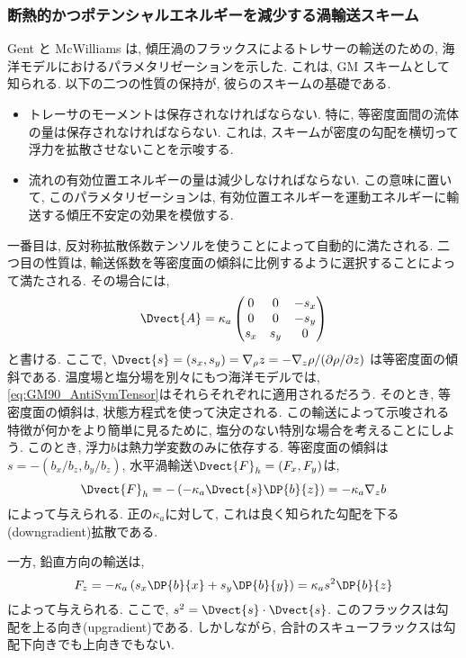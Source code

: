 \subsubsection*{断熱的かつポテンシャルエネルギーを減少する渦輸送スキーム}
Gent と McWilliams は, 傾圧渦のフラックスによるトレサーの輸送のための, 
海洋モデルにおけるパラメタリゼーションを示した. 
これは, GM スキームとして知られる. 
以下の二つの性質の保持が, 彼らのスキームの基礎である. 
\begin{itemize}
 \item トレーサのモーメントは保存されなければならない. 特に, 等密度面間の流体の量は保存されなければならない. これは, スキームが密度の勾配を横切って浮力を拡散させないことを示唆する. 
 \item 流れの有効位置エネルギーの量は減少しなければならない. この意味に置いて, このパラメタリゼーションは, 有効位置エネルギーを運動エネルギーに輸送する傾圧不安定の効果を模倣する. 
\end{itemize}
一番目は, 反対称拡散係数テンソルを使うことによって自動的に満たされる. 
二つ目の性質は, 輸送係数を等密度面の傾斜に比例するように選択することによって満たされる. 
その場合には, 
\begin{equation}
  \Dvect{A} = \kappa_a
\begin{pmatrix}
 0 &0 &-s_x \\
 0 &0 &-s_y \\
 s_x &s_y &0
\end{pmatrix}
\label{eq:GM90_AntiSymTensor}
\end{equation}
と書ける. 
ここで, $\Dvect{s}=(s_x, s_y)=\nabla_\rho z=- \nabla_z \rho/(\partial \rho/\partial z)$
は等密度面の傾斜である. 
温度場と塩分場を別々にもつ海洋モデルでは, \eqref{eq:GM90_AntiSymTensor}はそれらそれぞれに適用されるだろう. 
そのとき, 等密度面の傾斜は, 状態方程式を使って決定される. 
この輸送によって示唆される特徴が何かをより簡単に見るために, 塩分のない特別な場合を考えることにしよう. 
このとき, 浮力$b$は熱力学変数のみに依存する. 
等密度面の傾斜は$s=-(b_x/b_z, b_y/b_z)$, 水平渦輸送$\Dvect{F}_h=(F_x, F_y)$は, 
\begin{equation}
 \Dvect{F}_h = -\left(-\kappa_a \Dvect{s} \DP{b}{z} \right)
             = - \kappa_a \nabla_z b
\end{equation}
によって与えられる. 
正の$\kappa_a$に対して, これは良く知られた勾配を下る(downgradient)拡散である. 

一方, 鉛直方向の輸送は, 
\begin{equation}
  F_z = - \kappa_a \left(s_x\DP{b}{x} + s_y\DP{b}{y}\right)
      = \kappa_a s^2 \DP{b}{z} 
\end{equation}
によって与えられる. 
ここで, $s^2=\Dvect{s}\cdot\Dvect{s}$. 
このフラックスは勾配を上る向き(upgradient)である. 
しかしながら, 合計のスキューフラックスは勾配下向きでも上向きでもない. 

